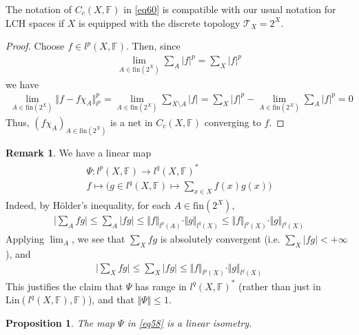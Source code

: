 \documentclass[12pt,b5paper,notitlepage]{article}
\theoremstyle{definition}
\newtheorem{rem}[df]{Remark}
\theoremstyle{plain}
\newtheorem{pp}[df]{Proposition}
\newcommand{\mc}{\mathcal}
\newcommand{\fin}{\mathrm{fin}}
\newcommand{\Fbb}{\mathbb F}
\newcommand{\Lin}{\mathrm{Lin}}
\numberwithin{equation}{section}
\begin{document}
The notation of $C_c(X,\Fbb)$ in \eqref{eq60} is compatible with our usual notation for LCH spaces if $X$ is equipped with the discrete topology $\mc T_X=2^X$.

\begin{proof}
Choose $f\in l^p(X,\Fbb)$. Then, since
\begin{align*}
\lim_{A\in\fin(2^X)}\sum_A|f|^p=\sum_X|f|^p
\end{align*}
we have
\begin{align*}
\lim_{A\in\fin(2^X)} \Vert f-f\chi_A\Vert_{l^p}^p=\lim_{A\in\fin(2^X)}\sum_{X\setminus A}|f|=\sum_X|f|^p-\lim_{A\in\fin(2^X)}\sum_A|f|^p=0
\end{align*}
Thus, $(f\chi_A)_{A\in\fin(2^X)}$ is a net in $C_c(X,\Fbb)$ converging to $f$.
\end{proof}




\begin{rem}\label{lb108}
We have a linear map
\begin{gather}\label{eq58}
\begin{gathered}
\Psi:l^p(X,\Fbb)\rightarrow l^q(X,\Fbb)^*\\
f\mapsto\Big(g\in l^q(X,\Fbb)\mapsto \sum_{x\in X}f(x)g(x)\Big)
\end{gathered}
\end{gather}
Indeed, by H\"older's inequality, for each $A\in\fin(2^X)$,
\begin{align*}
\Big|\sum_A fg\Big|\leq\sum_A|fg|\leq \Vert f\Vert_{l^p(A)}\cdot\Vert g\Vert_{l^q(X)}\leq \Vert f\Vert_{l^p(X)}\cdot\Vert g\Vert_{l^q(X)}
\end{align*}
Applying $\lim_A$, we see that $\sum_Xfg$ is absolutely convergent (i.e. $\sum_X|fg|<+\infty$), and 
\begin{align*}
\Big|\sum_X fg\Big|\leq\sum_X|fg|\leq\Vert f\Vert_{l^p(X)}\cdot\Vert g\Vert_{l^q(X)}
\end{align*}
This justifies the claim that $\Psi$ has range in $l^q(X,\Fbb)^*$ (rather than just in $\Lin(l^q(X,\Fbb),\Fbb)$), and that $\Vert\Psi\Vert\leq 1$.
\end{rem}

\begin{pp}\label{lb112}
The map $\Psi$ in \eqref{eq58} is a linear isometry.
\end{pp}
\end{document}
